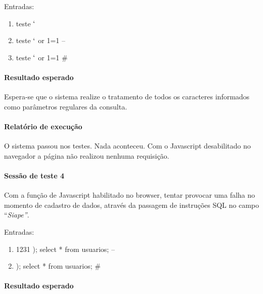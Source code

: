 \documentclass[
    12pt,               %
    openright,          %
    oneside,            %
    a4paper,            %
    section=TITLE,     %
    english,            %
    french,             %
    spanish,            %
    brazil              %
    ]{abntex2}
\begin{document}
Entradas:



\begin{enumerate}[start=1]
	
\item teste $\lq$
	
\item teste $\lq$ or 1=1 --
	
\item teste $\lq$ or 1=1 \#

\end{enumerate}


\paragraph*{Resultado esperado}

Espera-se que o sistema realize o tratamento de todos os caracteres informados como parâmetros regulares da consulta.



\paragraph*{Relatório de execução}

O sistema passou nos testes. Nada aconteceu. Com o Javascript desabilitado no navegador a página não realizou nenhuma requisição.



\paragraph*{Sessão de teste 4}

Com a função de Javascript habilitado no browser, tentar provocar uma falha no momento de cadastro de dados, através da passagem de instruções SQL no campo \textquotedblleft{}\emph{Siape\textquotedblright{}}.


Entradas:



\begin{enumerate}[start=1]
	
\item 1231 ); select * from usuarios; --
	
\item ); select * from usuarios; \#

\end{enumerate}


\paragraph*{Resultado esperado}
\end{document}
